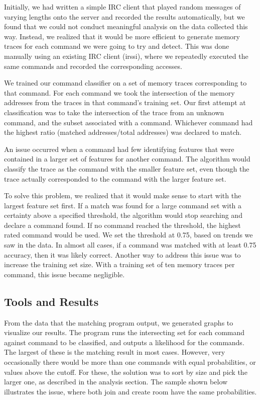 \documentclass[11pt, oneside]{article}
\begin{document}
Initially, we had written a simple IRC client that played random messages of 
varying lengths onto the server and recorded the results automatically, but we 
found that we could not conduct meaningful analysis on the data collected this 
way. Instead, we realized that it would be more efficient to generate  memory 
traces for each command we were going to try and detect. This was done 
manually using an existing IRC client (irssi), where we repeatedly executed 
the same commands and recorded the corresponding accesses. 

We trained our command classifier on a set of memory traces corresponding to 
that command. For each command we took the intersection of the memory 
addresses from the traces in that command's training set. Our first attempt at 
classification was to take the intersection of the trace from an unknown 
command, and the subset associated with a command. Whichever command had the 
highest ratio (matched addresses/total addresses) was declared to match.

An issue occurred when a command had few identifying features that were 
contained in a larger set of features for another command. The algorithm would 
classify the trace as the command with the smaller feature set, even though 
the trace actually corresponded to the command with the larger feature set. 

To solve this problem, we realized that it would make sense to start with the 
largest feature set first. If a match was found for a large command set with a 
certainty above a specified threshold, the algorithm would stop searching and 
declare a command found. If no command reached the threshold, the highest 
rated command would be used. We set the threshold at 0.75, based on trends we 
saw in the data. In almost all cases, if a command was matched with at least 
0.75 accuracy, then it was likely correct. Another way to address this issue 
was to increase the training set size. With a training set of ten memory 
traces per command, this issue became negligible.

\subsection{Tools and Results}
From the data that the matching program output, we generated graphs to 
visualize our results. The program runs the intersecting set for each command 
against command to be classified, and outputs a likelihood for the commands. 
The largest of these is the matching result in most cases. However, very 
occasionally there would be more than one commands with equal probabilities, 
or values above the cutoff. For these, the solution was to sort by size and 
pick the larger one, as described in the analysis section. The sample shown 
below illustrates the issue, where both join and create room have the same 
probabilities.
\end{document}
